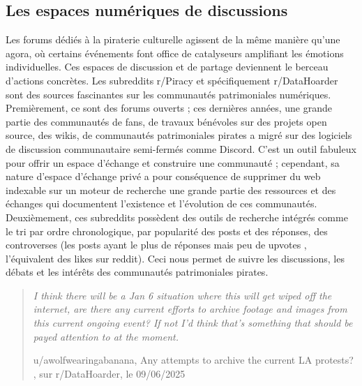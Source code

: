 \subsection*{Les espaces numériques de discussions}

Les forums dédiés à la piraterie culturelle agissent de la même manière qu'une agora, où certains événements font office de catalyseurs amplifiant les émotions individuelles. Ces espaces de discussion et de partage deviennent le berceau d'actions concrètes. Les subreddits r/Piracy et spécifiquement r/DataHoarder sont des sources fascinantes sur les communautés patrimoniales numériques. Premièrement, ce sont des forums ouverts ; ces dernières années, une grande partie des communautés de fans, de travaux bénévoles sur des projets open source, des wikis, de communautés patrimoniales pirates a migré sur des logiciels de discussion communautaire semi-fermés comme Discord. C'est un outil fabuleux pour offrir un espace d'échange et construire une communauté ; cependant, sa nature d'espace d'échange privé a pour conséquence de supprimer du web indexable sur un moteur de recherche une grande partie des ressources et des échanges qui documentent l'existence et l'évolution de ces communautés. Deuxièmement, ces subreddits possèdent des outils de recherche intégrés comme le tri par ordre chronologique, par popularité des posts et des réponses, des controverses (les posts ayant le plus de réponses mais peu de \og upvotes \fg, l'équivalent des likes sur reddit). Ceci nous permet de suivre les discussions, les débats et les intérêts des communautés patrimoniales pirates.

\begin{quote}

     \textit{I think there will be a Jan 6 situation where this will get wiped off the internet, are there any current efforts to archive footage and images from this current ongoing event? If not I'd think that's something that should be payed attention to at the moment.} 

     u/awolfwearingabanana, \og Any attempts to archive the current LA protests? \fg, sur r/DataHoarder, le 09/06/2025
\end{quote}

